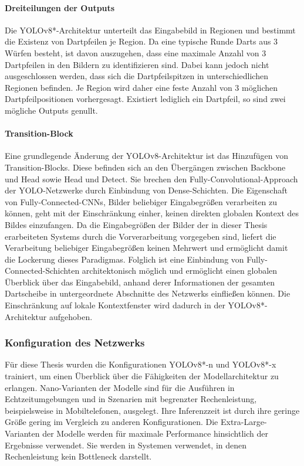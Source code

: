 \paragraph{Dreiteilungen der Outputs}

Die YOLOv8*-Architektur unterteilt das Eingabebild in Regionen und bestimmt die Existenz von Dartpfeilen je Region. Da eine typische Runde Darts aus 3 Würfen besteht, ist davon auszugehen, dass eine maximale Anzahl von 3 Dartpfeilen in den Bildern zu identifizieren sind. Dabei kann jedoch nicht ausgeschlossen werden, dass sich die Dartpfeilspitzen in unterschiedlichen Regionen befinden. Je Region wird daher eine feste Anzahl von 3 möglichen Dartpfeilpositionen vorhergesagt. Existiert lediglich ein Dartpfeil, so sind zwei mögliche Outputs genullt.

\paragraph{Transition-Block}

Eine grundlegende Änderung der YOLOv8-Architektur ist das Hinzufügen von Transition-Blocks. Diese befinden sich an den Übergängen zwischen Backbone und Head sowie Head und Detect. Sie brechen den Fully-Convolutional-Approach der YOLO-Netzwerke durch Einbindung von Dense-Schichten. Die Eigenschaft von Fully-Connected-CNNs, Bilder beliebiger Eingabegrößen verarbeiten zu können, geht mit der Einschränkung einher, keinen direkten globalen Kontext des Bildes einzufangen. Da die Eingabegrößen der Bilder der in dieser Thesis erarbeiteten Systems durch die Vorverarbeitung vorgegeben sind, liefert die Verarbeitung beliebiger Eingabegrößen keinen Mehrwert und ermöglicht damit die Lockerung dieses Paradigmas. Folglich ist eine Einbindung von Fully-Connected-Schichten architektonisch möglich und ermöglicht einen globalen Überblick über das Eingabebild, anhand derer Informationen der gesamten Dartscheibe in untergeordnete Abschnitte des Netzwerks einfließen können. Die Einschränkung auf lokale Kontextfenster wird dadurch in der YOLOv8*-Architektur aufgehoben.

\subsubsection{Konfiguration des Netzwerks}

Für diese Thesis wurden die Konfigurationen YOLOv8*-n und YOLOv8*-x trainiert, um einen Überblick über die Fähigkeiten der Modellarchitektur zu erlangen. Nano-Varianten der Modelle sind für die Ausführen in Echtzeitumgebungen und in Szenarien mit begrenzter Rechenleistung, beispielsweise in Mobiltelefonen, ausgelegt. Ihre Inferenzzeit ist durch ihre geringe Größe gering im Vergleich zu anderen Konfigurationen. Die Extra-Large-Varianten der Modelle werden für maximale Performance hinsichtlich der Ergebnisse verwendet. Sie werden in Systemen verwendet, in denen Rechenleistung kein Bottleneck darstellt.

